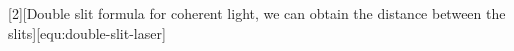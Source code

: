 [2][Double slit formula for coherent light, we can obtain the distance between the slits][equ:double-slit-laser]{
	\vspace{-0.5cm}
}